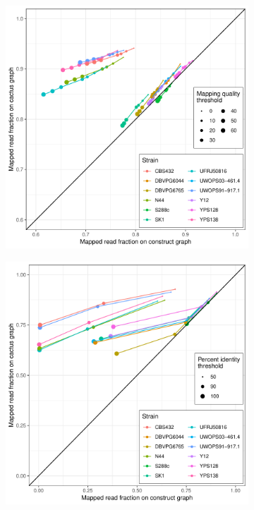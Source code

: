 \documentclass{article}
\begin{document}
\clearpage
\begin{figure}
  \begin{subfigure}[b]{.5\textwidth}
    \caption{}
    \includegraphics[width=\textwidth]{pdf/yeast-mapping-quality-all.pdf}
  \end{subfigure}
  \begin{subfigure}[b]{.5\textwidth}
    \caption{}
    \includegraphics[width=\textwidth]{pdf/yeast-mapping-identity-all.pdf}
  \end{subfigure}
\end{figure}
\end{document}
